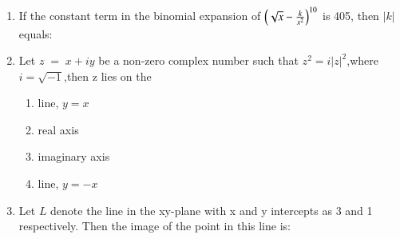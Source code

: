 \documentclass[journal,,12pt,onecolumn]{IEEEtran}
\theoremstyle{remark}
\begin{document}
\begin{enumerate}
\begin{enumerate}
        
        \end{enumerate}
        \item If the constant term in the binomial expansion of $\left(\sqrt{x}-\frac{k}{x^2}\right)^{10}$ is 405, then $|k|$ equals:
        \begin{enumerate}
        \end{enumerate}
\item Let $z\;=\;x+iy$ be a non-zero complex number such that $z^2=i|z|^2$,where $i=\sqrt{-1}$,then z lies on the
        \begin{enumerate}
        \item line, $y=x$
        \item real axis
        \item imaginary axis
        \item line, $y=-x$
        \end{enumerate}
    \item Let $L$ denote the line in the xy-plane with x and y intercepts as 3 and 1 respectively. Then the image of the point  in this line is:
    \begin{enumerate}
       \end{enumerate}


\end{enumerate}
\end{document}
